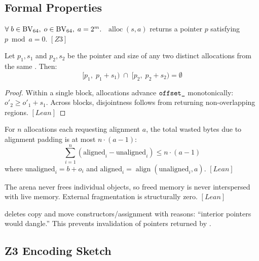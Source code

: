 \subsection{Formal Properties}

\begin{theorem}
\label{thm:alloc-align}
$\forall\; b \in \mathrm{BV}_{64},\; o \in \mathrm{BV}_{64},\; a = 2^m.\;$
$\operatorname{alloc}(s, a)$ returns a pointer $p$ satisfying
$p \bmod a = 0$.
\quad$[\textit{Z3}]$
\end{theorem}

\begin{theorem}
\label{thm:alloc-disjoint}
Let $p_1, s_1$ and $p_2, s_2$ be the pointer and size of any two
distinct allocations from the same .  Then:
\[
  [p_1,\; p_1 + s_1) \;\cap\; [p_2,\; p_2 + s_2) = \emptyset
\]
\end{theorem}
\begin{proof}
Within a single block, allocations advance $\texttt{offset\_}$
monotonically: $o'_2 \ge o'_1 + s_1$.  Across blocks, disjointness
follows from  returning non-overlapping regions.
$[\textit{Lean}]$
\end{proof}

\begin{theorem}
\label{thm:alloc-waste}
For $n$ allocations each requesting alignment $a$, the total wasted
bytes due to alignment padding is at most $n \cdot (a - 1)$:
\[
  \sum_{i=1}^{n} (\text{aligned}_{i} - \text{unaligned}_{i}) \le n \cdot (a - 1)
\]
where $\text{unaligned}_i = b + o_i$ and $\text{aligned}_i = \operatorname{align}(\text{unaligned}_i, a)$.
\quad$[\textit{Lean}]$
\end{theorem}

\begin{theorem}
\label{thm:arena-nofrag}
The arena never frees individual objects, so freed memory is never
interspersed with live memory.  External fragmentation is
structurally zero.
\quad$[\textit{Lean}]$
\end{theorem}

\begin{property}
\label{prop:arena-noncopy}
 deletes copy and move constructors/assignment with
reasons: ``interior pointers would dangle.''
This prevents invalidation of pointers returned by .
\end{property}

\subsection{Z3 Encoding Sketch}
\label{sec:arena-z3}

